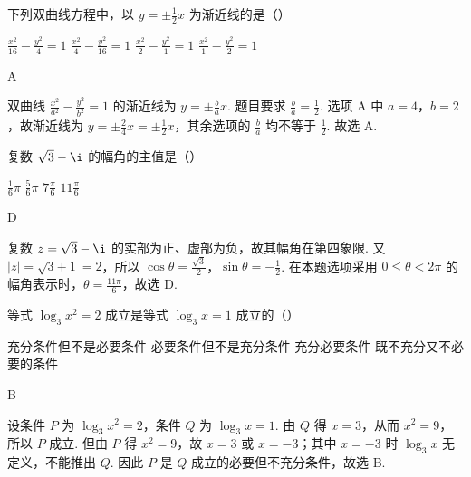 \documentclass[UTF8,a4paper,oneside,11pt]{ctexbook}
\begin{document}
\begin{problem}

下列双曲线方程中，以 \(y = \pm \frac{1}{2}x \) 为渐近线的是（\quad）

\choices
    {\(\frac{x^{2}}{16}-\frac{y^{2}}{4}=1 \)}
    {\(\frac{x^{2}}{4}-\frac{y^{2}}{16}=1 \)}
    {\(\frac{x^{2}}{2}-\frac{y^{2}}{1}=1 \)}
    {\(\frac{x^{2}}{1}-\frac{y^{2}}{2}=1 \)}
\end{problem}

\begin{answer}
A
\end{answer}

\begin{solution}
双曲线 \(\frac{x^{2}}{a^{2}}-\frac{y^{2}}{b^{2}}=1\) 的渐近线为 \(y=\pm\frac{b}{a}x\). 题目要求 \(\frac{b}{a}=\frac12\). 选项 A 中 \(a=4\)，\(b=2\)，故渐近线为 \(y=\pm\frac{2}{4}x=\pm\frac12x\)，其余选项的 \(\frac{b}{a}\) 均不等于 \(\frac12\). 故选 A.
\end{solution}

\begin{problem}

复数 \(\sqrt{3} - \i\) 的幅角的主值是（\quad）

\choices
    {\(\frac{1}{6}\pi\)}
    {\(\frac{5}{6}\pi\)}
    {\(7\frac{\pi}{6}\)}
    {\(11\frac{\pi}{6}\)}
\end{problem}

\begin{answer}
D
\end{answer}

\begin{solution}
复数 \(z=\sqrt3-\i\) 的实部为正、虚部为负，故其幅角在第四象限. 又 \(|z|=\sqrt{3+1}=2\)，所以 \(\cos\theta=\frac{\sqrt3}{2}\)，\(\sin\theta=-\frac12\). 在本题选项采用 \(0\leqslant\theta<2\pi\) 的幅角表示时，\(\theta=\frac{11\pi}{6}\)，故选 D.
\end{solution}

\begin{problem}

等式 \(\log_3 x^2 = 2\) 成立是等式 \(\log_3 x = 1\) 成立的（\quad）

\choices
    {充分条件但不是必要条件}
    {必要条件但不是充分条件}
    {充分必要条件}
    {既不充分又不必要的条件}
\end{problem}

\begin{answer}
B
\end{answer}

\begin{solution}
设条件 \(P\) 为 \(\log_{3}x^{2}=2\)，条件 \(Q\) 为 \(\log_{3}x=1\). 由 \(Q\) 得 \(x=3\)，从而 \(x^{2}=9\)，所以 \(P\) 成立. 但由 \(P\) 得 \(x^{2}=9\)，故 \(x=3\) 或 \(x=-3\)；其中 \(x=-3\) 时 \(\log_{3}x\) 无定义，不能推出 \(Q\). 因此 \(P\) 是 \(Q\) 成立的必要但不充分条件，故选 B.
\end{solution}
\end{document}
